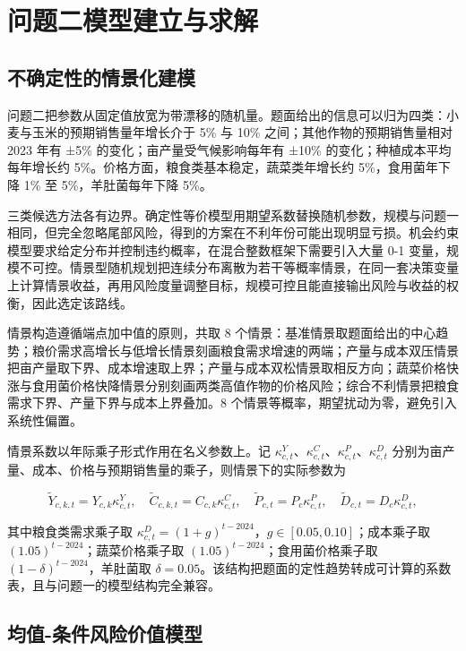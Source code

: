 \documentclass[bwprint]{gmcmthesis}
\begin{document}
\section{问题二模型建立与求解}

\subsection{不确定性的情景化建模}

问题二把参数从固定值放宽为带漂移的随机量。题面给出的信息可以归为四类：小麦与玉米的预期销售量年增长介于 5\% 与 10\% 之间；其他作物的预期销售量相对 2023 年有 ±5\% 的变化；亩产量受气候影响每年有 ±10\% 的变化；种植成本平均每年增长约 5\%。价格方面，粮食类基本稳定，蔬菜类年增长约 5\%，食用菌年下降 1\% 至 5\%，羊肚菌每年下降 5\%。

三类候选方法各有边界。确定性等价模型用期望系数替换随机参数，规模与问题一相同，但完全忽略尾部风险，得到的方案在不利年份可能出现明显亏损。机会约束模型要求给定分布并控制违约概率，在混合整数框架下需要引入大量 0-1 变量，规模不可控。情景型随机规划把连续分布离散为若干等概率情景，在同一套决策变量上计算情景收益，再用风险度量调整目标，规模可控且能直接输出风险与收益的权衡，因此选定该路线。

情景构造遵循端点加中值的原则，共取 8 个情景：基准情景取题面给出的中心趋势；粮价需求高增长与低增长情景刻画粮食需求增速的两端；产量与成本双压情景把亩产量取下界、成本增速取上界；产量与成本双松情景取相反方向；蔬菜价格快涨与食用菌价格快降情景分别刻画两类高值作物的价格风险；综合不利情景把粮食需求下界、产量下界与成本上界叠加。8 个情景等概率，期望扰动为零，避免引入系统性偏置。

情景系数以年际乘子形式作用在名义参数上。记 $\kappa^{Y}_{c,t}$、$\kappa^{C}_{c,t}$、$\kappa^{P}_{c,t}$、$\kappa^{D}_{c,t}$ 分别为亩产量、成本、价格与预期销售量的乘子，则情景下的实际参数为

\begin{equation}
\tilde{Y}_{c,k,t}=Y_{c,k}\kappa^{Y}_{c,t},\quad \tilde{C}_{c,k,t}=C_{c,k}\kappa^{C}_{c,t},\quad \tilde{P}_{c,t}=P_c\kappa^{P}_{c,t},\quad \tilde{D}_{c,t}=D_c\kappa^{D}_{c,t},
\end{equation}

其中粮食类需求乘子取 $\kappa^{D}_{c,t}=(1+g)^{t-2024}$，$g\in[0.05,0.10]$；成本乘子取 $(1.05)^{t-2024}$；蔬菜价格乘子取 $(1.05)^{t-2024}$；食用菌价格乘子取 $(1-\delta)^{t-2024}$，羊肚菌取 $\delta=0.05$。该结构把题面的定性趋势转成可计算的系数表，且与问题一的模型结构完全兼容。

\subsection{均值-条件风险价值模型}
\end{document}
